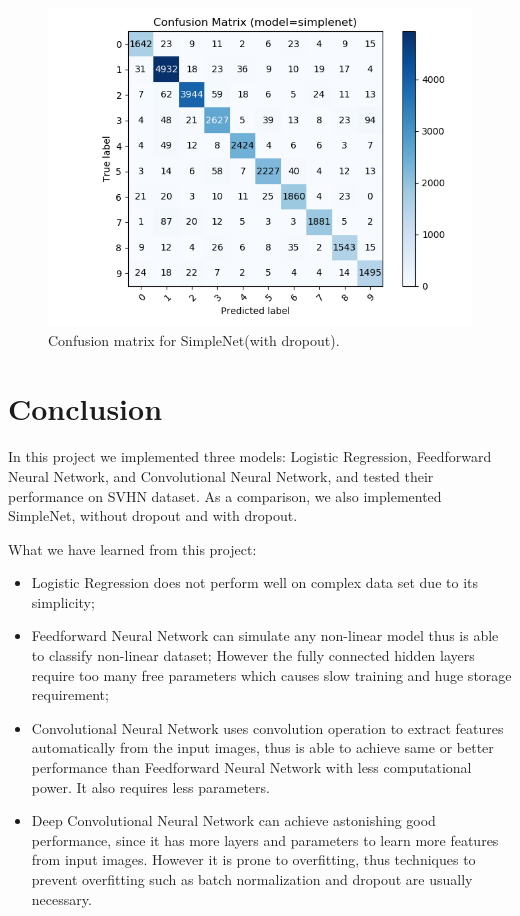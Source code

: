 \documentclass[journal]{IEEEtran}
\begin{document}
\begin{figure}[htb]
\includegraphics[width=\linewidth]{images/simplenet-cm.png}
\caption{Confusion matrix for SimpleNet(with dropout).}\label{fig:simplenet-dropout_cm}
\end{figure}


\section{Conclusion}

In this project we implemented three models: Logistic Regression, Feedforward Neural Network, and Convolutional Neural Network, and tested their performance on SVHN dataset.
As a comparison, we also implemented SimpleNet, without dropout and with dropout.

What we have learned from this project:
\begin{itemize}
\item Logistic Regression does not perform well on complex data set due to its simplicity;
\item Feedforward Neural Network can simulate any non-linear model thus is able to classify non-linear dataset; However the fully connected hidden layers require too many free parameters which causes slow training and huge storage requirement;
\item Convolutional Neural Network uses convolution operation to extract features automatically from the input images, thus is able to achieve same or better performance than Feedforward Neural Network with less computational power.
It also requires less parameters.
\item Deep Convolutional Neural Network can achieve astonishing good performance, since it has more layers and parameters to learn more features from input images. However it is prone to overfitting, thus techniques to prevent overfitting such as batch normalization and dropout are usually necessary.
\end{itemize}
\end{document}
